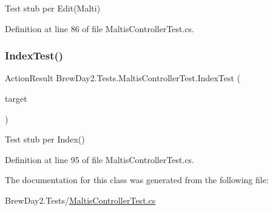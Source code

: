 Test stub per Edit(\+Malti)



Definition at line 86 of file Maltis\+Controller\+Test.\+cs.

\mbox{\label{class_brew_day2_1_1_tests_1_1_maltis_controller_test_a9a2610a29b4f116e3b1ea9220da08042}} 
\subsubsection{\texorpdfstring{Index\+Test()}{IndexTest()}}
{\footnotesize\ttfamily Action\+Result Brew\+Day2.\+Tests.\+Maltis\+Controller\+Test.\+Index\+Test (\begin{DoxyParamCaption}\item[{\mbox{[}\+Pex\+Assume\+Under\+Test\mbox{]} \mbox{\hyperlink{class_brew_day2_1_1_controllers_1_1_maltis_controller}{Maltis\+Controller}}}]{target }\end{DoxyParamCaption})}



Test stub per Index()



Definition at line 95 of file Maltis\+Controller\+Test.\+cs.



The documentation for this class was generated from the following file\+:\begin{DoxyCompactItemize}
\item 
Brew\+Day2.\+Tests/\mbox{\hyperlink{_maltis_controller_test_8cs}{Maltis\+Controller\+Test.\+cs}}\end{DoxyCompactItemize}
